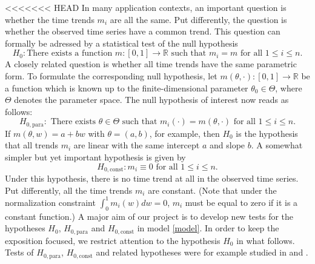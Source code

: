 \documentclass[a4paper,12pt]{article}
\begin{document}
 
<<<<<<< HEAD
\noindent In many application contexts, an important question is whether the time trends $m_i$ are all the same. Put differently, the question is whether the observed time series have a common trend. This question can formally be adressed by a statistical test of the null hypothesis 
\[ H_0: \text{There exists a function } m: [0,1] \rightarrow \mathbb{R} \text{ such that } m_i = m  \text{ for all } 1 \le i \le n. \]
A closely related question is whether all time trends have the same parametric form. To formulate the corresponding null hypothesis, let $m(\theta,\cdot): [0,1] \rightarrow \mathbb{R}$ be a function which is known up to the finite-dimensional parameter $\theta_0 \in \Theta$, where $\Theta$ denotes the parameter space. The null hypothesis of interest now reads as follows:  
\[ H_{0,\text{para}}: \text{ There exists } \theta \in \Theta \text{ such that } m_i(\cdot) = m(\theta,\cdot) \text{ for all } 1 \le i \le n. \]  
If $m(\theta,w) = a + b w$ with $\theta = (a,b)$, for example, then $H_0$ is the hypothesis that all trends $m_i$ are linear with the same intercept $a$ and slope $b$. A somewhat simpler but yet important hypothesis is given by 
\[ H_{0,\text{const}}: m_i \equiv 0 \text{ for all } 1 \le i \le n. \]
Under this hypothesis, there is no time trend at all in the observed time series. Put differently, all the time trends $m_i$ are constant. (Note that under the normalization constraint $\int_0^1 m_i(w) dw = 0$, $m_i$ must be equal to zero if it is a constant function.) A major aim of our project is to develop new tests for the hypotheses $H_0$, $H_{0,\text{para}}$ and $H_{0,\text{const}}$ in model \eqref{model}. In order to keep the exposition focused, we restrict attention to the hypothesis $H_0$ in what follows. Tests of $H_{0,\text{para}}$, $H_{0,\text{const}}$ and related hypotheses were for example studied in \cite{Lyubchich2016} and \cite{ChenWu2018}. 
\end{document}
